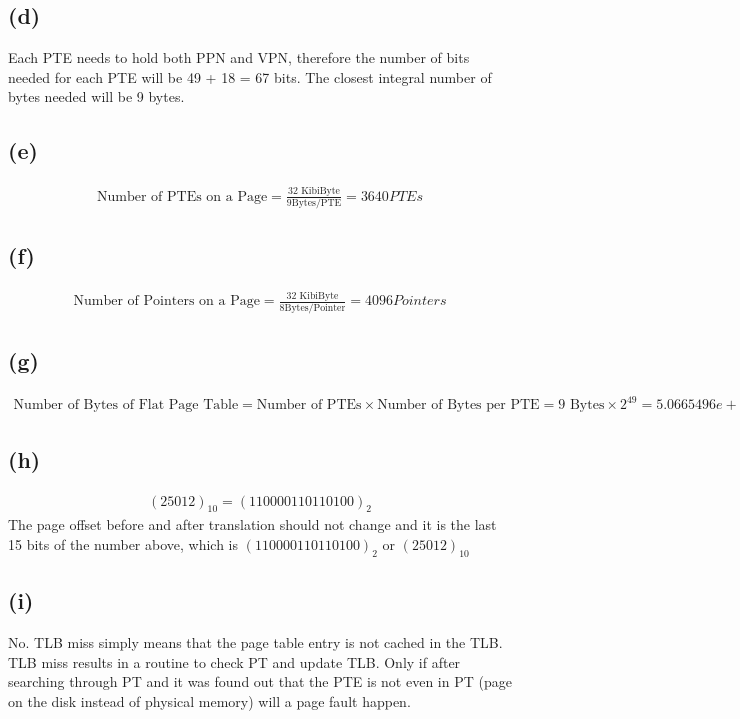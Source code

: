 \documentclass{article}
\begin{document}
	\subsection{(d)}
	Each PTE needs to hold both PPN and VPN, therefore the number of bits needed for each PTE will be 49 + 18 = 67 bits. The closest integral number of bytes needed will be 9 bytes.
	\subsection{(e)}
	\begin{align*}
		\mbox{Number of PTEs on a Page} = \frac{32\mbox{ KibiByte}}{9\mbox{Bytes/PTE}} = 3640 PTEs
	\end{align*}
	\subsection{(f)}
	\begin{align*}
		\mbox{Number of Pointers on a Page} = \frac{32\mbox{ KibiByte}}{8\mbox{Bytes/Pointer}} = 4096 Pointers
	\end{align*}
	\subsection{(g)}
	\begin{align*}
		\mbox{Number of Bytes of Flat Page Table} = \mbox{Number of PTEs} \times \mbox{Number of Bytes per PTE} = 9\mbox{ Bytes} \times 2^{49} = 5.0665496e+15 Bytes
	\end{align*}
	\subsection{(h)}
	\begin{align*}
		(25012)_{10} = (110000110110100)_{2}
	\end{align*}
	The page offset before and after translation should not change and it is the last 15 bits of the number above, which is $(110000110110100)_{2}$ or $(25012)_{10}$
	\subsection{(i)}
	No. TLB miss simply means that the page table entry is not cached in the TLB. TLB miss results in a routine to check PT and update TLB. Only if after searching through PT and it was found out that the PTE is not even in PT (page on the disk instead of physical memory) will a page fault happen.
\end{document}
